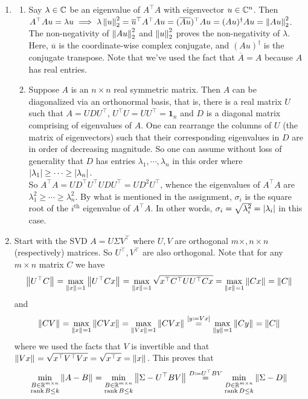 \begin{enumerate}[leftmargin=*]
\item 
\begin{enumerate}
\item Say $\lambda\in\mathbb{C}$ be an eigenvalue of $A^\top A$ with eigenvector $u\in\mathbb{C}^n$. Then $A^\top Au=\lambda u\implies \lambda \left\lVert u \right\rVert_{2}^2 =\overline{u}^\top A^\top Au = (\overline{Au})^\top Au = (Au)^\dagger Au = \left\lVert Au \right\rVert_{2}^2$. The non-negativity of $\left\lVert Au \right\rVert_{2}^2$ and $\left\lVert u \right\rVert_{2}^2$ proves the non-negativity of $\lambda$. \\
Here, $\overline u$ is the coordinate-wise complex conjugate, and $(Au)^\dagger$ is the conjugate transpose. Note that we've used the fact that $\overline A = A$ because $A$ has real entries.
\item Suppose $A$ is an $n\times n$ real symmetric matrix. Then $A$ can be diagonalized via an orthonormal basis, that is, there is a real matrix $U$ such that $A=UDU^\top$, $U^\top U = UU^\top = \pmb 1_n$ and $D$ is a diagonal matrix comprising of eigenvalues of $A$. One can rearrange the columns of $U$ (the matrix of eigenvectors) such that their corresponding eigenvalues in $D$ are in order of decreasing magnitude. So one can assume without loss of generality that $D$ has entries $\lambda_1,\cdots,\lambda_n$ in this order where $\left| \lambda_1 \right|\geq \cdots \geq \left| \lambda_n \right|$.\\
So $A^\top A = UD^\top U^\top UDU^\top = UD^2U^\top$, whence the eigenvalues of $A^\top A$ are $\lambda_1^2\geq \cdots\geq \lambda_n^2$. By what is mentioned in the assignment, $\sigma_i$ is the square root of the $i^{\text{th}}$ eigenvalue of $A^\top A$. In other words, $\sigma_i = \sqrt{\lambda_i^2} = \left| \lambda_i \right|$ in this case.
\end{enumerate}
\item Start with the SVD $A=U\Sigma V^\top$ where $U,V$ are orthogonal $m\times, n\times n$ (respectively) matrices. So $U^\top,V^\top$ are also orthogonal. Note that for any $m\times n$ matrix $C$ we have $$\left\lVert U^\top C \right\rVert_{} = \max_{\left\lVert x \right\rVert_{}=1}\left\lVert U^\top Cx \right\rVert_{} = \max_{\left\lVert x \right\rVert_{}=1}\sqrt{x^\top C^\top UU^\top Cx} = \max_{\left\lVert x \right\rVert_{}=1}\left\lVert Cx \right\rVert_{} = \left\lVert C \right\rVert_{}$$
and 
$$\left\lVert CV \right\rVert_{} = \max_{\left\lVert x \right\rVert_{}=1}\left\lVert CVx \right\rVert_{} = \max_{\left\lVert V x \right\rVert_{}=1}\left\lVert CVx \right\rVert_{} \stackrel{[y\coloneqq Vx]}{=} \max_{\left\lVert y \right\rVert_{}=1}\left\lVert Cy \right\rVert_{} = \left\lVert C \right\rVert_{}$$
where we used the facts that $V$ is invertible and that $\left\lVert Vx \right\rVert_{} = \sqrt{x^\top V^\top Vx} = \sqrt{x^\top x} = \left\lVert x \right\rVert_{}$.
This proves that $$\min_{\substack{B\in\mathbb{R}^{m\times n}\\ \operatorname{rank} B\leq k} } \left\lVert A-B \right\rVert_{} = \min_{\substack{B\in\mathbb{R}^{m\times n}\\ \operatorname{rank} B\leq k} } \left\lVert \Sigma-U^\top BV \right\rVert_{} \stackrel{D\coloneqq U^\top BV}{=} \min_{\substack{D\in\mathbb{R}^{m\times n}\\ \operatorname{rank} D\leq k} } \left\lVert \Sigma-D \right\rVert_{}$$

\end{enumerate}
